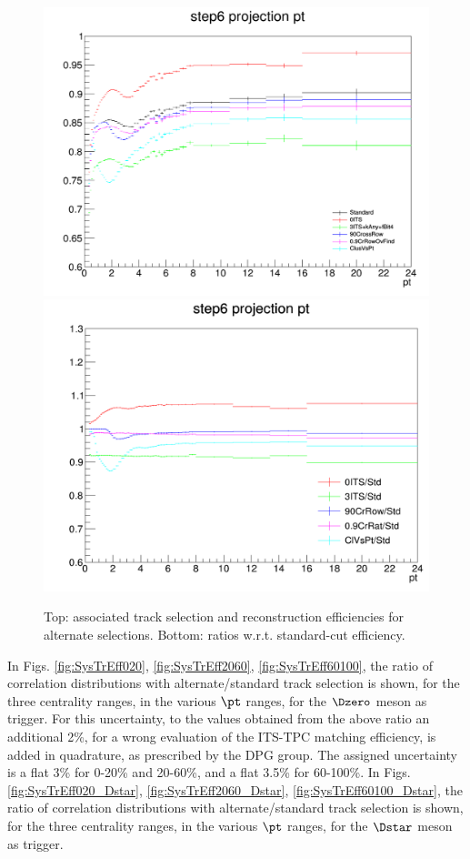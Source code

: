\begin{figure}
\centering
{\includegraphics[width=0.75\linewidth]{figuresVsCent/Dzero/SystTrackEff/AltTrackEff.png}}
{\includegraphics[width=0.75\linewidth]{figuresVsCent/Dzero/SystTrackEff/AltTrackEffRatios.png}}
\caption{Top: associated track selection and reconstruction efficiencies for alternate selections. Bottom: ratios w.r.t. standard-cut efficiency.}
\label{fig:TrEffVariations}
\end{figure}

In Figs. \ref{fig:SysTrEff020}, \ref{fig:SysTrEff2060}, \ref{fig:SysTrEff60100}, the ratio of correlation distributions with alternate/standard track selection is shown, for the three centrality ranges, in the various $\pt$ ranges, for the $\Dzero$ meson as trigger.
For this uncertainty, to the values obtained from the above ratio an additional 2\%, for a wrong evaluation of the ITS-TPC matching efficiency, is added in quadrature, as prescribed by the DPG group.
The assigned uncertainty is a flat 3\% for 0-20\% and 20-60\%, and a flat 3.5\% for 60-100\%.
In Figs. \ref{fig:SysTrEff020_Dstar}, \ref{fig:SysTrEff2060_Dstar}, \ref{fig:SysTrEff60100_Dstar}, the ratio of correlation distributions with alternate/standard track selection is shown, for the three centrality ranges, in the various $\pt$ ranges, for the $\Dstar$ meson as trigger.

